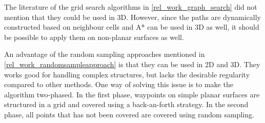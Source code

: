 The literature of the grid search algorithms in \ref{rel_work_graph_search} did not mention that they could be used in 3D. However, since the paths are dynamically constructed based on neighbour cells and A* can be used in 3D as well, it should be possible to apply them on non-planar surfaces as well.

An advantage of the random sampling approaches mentioned in \ref{rel_work_randomsampleapproach} is that they can be used in 2D and 3D. They works good for handling complex structures, but lacks the desirable regularity compared to other methods. One way of solving this issue is to make the algorithm two-phased. In the first phase, waypoints on simple planar surfaces are structured in a grid and covered using a back-an-forth strategy. In the second phase, all points that has not been covered are covered using random sampling. \cite{6386126}



